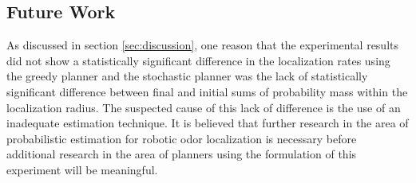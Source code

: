 \documentclass[submit, 12pt]{aiaa-pretty-modified}
\begin{document}


\subsection{Future Work}
As discussed in section \ref{sec:discussion}, one reason that the
experimental results did not show a statistically significant
difference in the localization rates using the
greedy planner and the stochastic planner was the lack of statistically significant
difference between final and initial sums of probability mass within
the localization radius.  The suspected cause of this lack of
difference is the use of an inadequate estimation technique.  It is
believed that further research in the area of probabilistic estimation for robotic
odor localization is necessary before additional research in the area
of planners using the formulation of this experiment will be meaningful.
\end{document}
